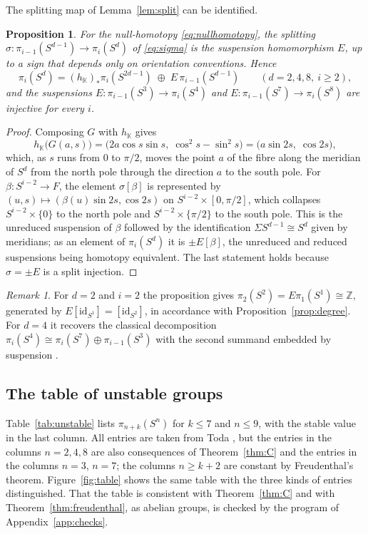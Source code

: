 \documentclass[11pt]{amsart}
\numberwithin{equation}{section}
\theoremstyle{plain}
\newtheorem{proposition}[theorem]{Proposition}
\theoremstyle{definition}
\theoremstyle{remark}
\newtheorem{remark}[theorem]{Remark}
\newcommand{\K}{\mathbb{K}}
\newcommand{\Z}{\mathbb{Z}}
\begin{document}
The splitting map of Lemma~\ref{lem:split} can be identified.

\begin{proposition}\label{prop:sigmaE}
For the null-homotopy \eqref{eq:nullhomotopy}, the splitting $\sigma\colon\pi_{i-1}(S^{d-1})\to\pi_i(S^d)$ of \eqref{eq:sigma} is the suspension homomorphism $E$, up to a sign that depends only on orientation conventions. Hence
\[
\pi_i(S^d)=(h_\K)_*\pi_i(S^{2d-1})\;\oplus\;E\,\pi_{i-1}(S^{d-1})\qquad(d=2,4,8,\ i\ge2),
\]
and the suspensions $E\colon\pi_{i-1}(S^3)\to\pi_i(S^4)$ and $E\colon\pi_{i-1}(S^7)\to\pi_i(S^8)$ are injective for every $i$.
\end{proposition}

\begin{proof}
Composing $G$ with $h_\K$ gives
\[
h_\K\bigl(G(a,s)\bigr)=\bigl(2a\cos s\sin s,\;\cos^2s-\sin^2s\bigr)=\bigl(a\sin2s,\;\cos2s\bigr),
\]
which, as $s$ runs from $0$ to $\pi/2$, moves the point $a$ of the fibre along the meridian of $S^d$ from the north pole through the direction $a$ to the south pole. For $\beta\colon S^{i-2}\to F$, the element $\sigma[\beta]$ is represented by $(u,s)\mapsto(\beta(u)\sin2s,\cos2s)$ on $S^{i-2}\times[0,\pi/2]$, which collapses $S^{i-2}\times\{0\}$ to the north pole and $S^{i-2}\times\{\pi/2\}$ to the south pole. This is the unreduced suspension of $\beta$ followed by the identification $\Sigma S^{d-1}\cong S^d$ given by meridians; as an element of $\pi_i(S^d)$ it is $\pm E[\beta]$, the unreduced and reduced suspensions being homotopy equivalent. The last statement holds because $\sigma=\pm E$ is a split injection.
\end{proof}

\begin{remark}
For $d=2$ and $i=2$ the proposition gives $\pi_2(S^2)=E\pi_1(S^1)\cong\Z$, generated by $E[\mathrm{id}_{S^1}]=[\mathrm{id}_{S^2}]$, in accordance with Proposition~\ref{prop:degree}. For $d=4$ it recovers the classical decomposition $\pi_i(S^4)\cong\pi_i(S^7)\oplus\pi_{i-1}(S^3)$ with the second summand embedded by suspension \cite[Chapter~V]{Tod62}.
\end{remark}

\subsection{The table of unstable groups}\label{sec:table}

Table~\ref{tab:unstable} lists $\pi_{n+k}(S^n)$ for $k\le7$ and $n\le9$, with the stable value in the last column. All entries are taken from Toda \cite{Tod62}, but the entries in the columns $n=2,4,8$ are also consequences of Theorem~\ref{thm:C} and the entries in the columns $n=3$, $n=7$; the columns $n\ge k+2$ are constant by Freudenthal's theorem. Figure~\ref{fig:table} shows the same table with the three kinds of entries distinguished. That the table is consistent with Theorem~\ref{thm:C} and with Theorem~\ref{thm:freudenthal}, as abelian groups, is checked by the program of Appendix~\ref{app:checks}.
\end{document}
